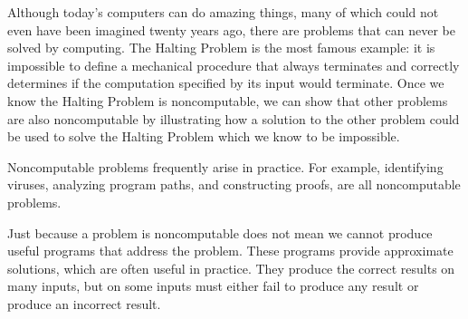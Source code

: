 \begin{schemeregion}
Although today's computers can do amazing things, many of which could not even have been imagined twenty years ago, there are problems that can never be solved by computing.  The Halting Problem is the most famous example: it is impossible to define a mechanical procedure that always terminates and correctly determines if the computation specified by its input would terminate.  Once we know the Halting Problem is noncomputable, we can show that other problems are also noncomputable by illustrating how a solution to the other problem could be used to solve the Halting Problem which we know to be impossible.  

Noncomputable problems frequently arise in practice.  For example, identifying viruses, analyzing program paths, and constructing proofs, are all noncomputable problems.  

Just because a problem is noncomputable does not mean we cannot produce useful programs that address the problem.  These programs provide approximate solutions, which are often useful in practice.  They produce the correct results on many inputs, but on some inputs must either fail to produce any result or produce an incorrect result.  

\end{schemeregion}
